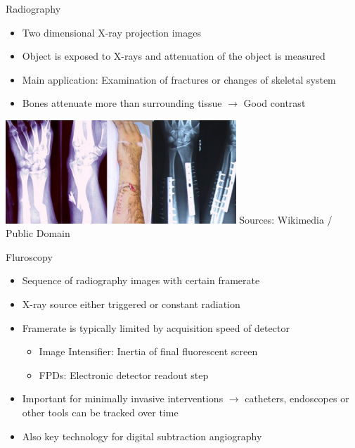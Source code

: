 \begin{frame}{Radiography}
    \begin{itemize}
        \item Two dimensional X-ray projection images
        \item Object is exposed to X-rays and attenuation of the object is measured
        \item Main application: Examination of fractures or changes of skeletal system
        \item Bones attenuate more than surrounding tissue $\rightarrow$ Good contrast
              \vspace{0.3cm}
    \end{itemize}
    \begin{center}
        \hfill{}\includegraphics[width=0.65\textwidth]{images/Broken_fixed_arm}\hfill{} \scriptsize Sources: Wikimedia / Public Domain
    \end{center}
\end{frame}

\begin{frame}[c]{Fluroscopy}
    \begin{itemize}
        \setlength\itemsep{0.4cm}
        \item Sequence of radiography images with certain framerate
        \item X-ray source either triggered or constant radiation
        \item Framerate is typically limited by acquisition speed of detector
              \begin{itemize}
                  \item Image Intensifier: Inertia of final fluorescent screen
                  \item FPDs: Electronic detector readout step
              \end{itemize}
        \item Important for minimally invasive interventions $\rightarrow$ catheters, endoscopes or other tools can be tracked over time
        \item Also key technology for digital subtraction angiography
    \end{itemize}
\end{frame}

